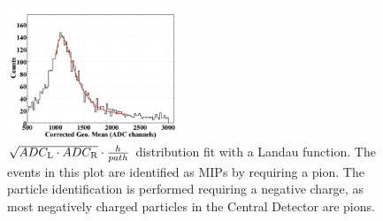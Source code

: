 \begin{figure}
\begin{center}
\includegraphics[width=0.45\textwidth]{Figure/energy.png} 
\caption{$\sqrt{ADC_{\rm{L}}\cdot ADC_{\rm{R}}}\cdot \frac{h}{path} $ distribution fit with a Landau function. The events in this plot are identified as MIPs by requiring a pion. The particle identification is performed requiring a negative charge, as most negatively charged particles in the Central Detector are pions.}
\label{energy}
\end{center}
\end{figure}
